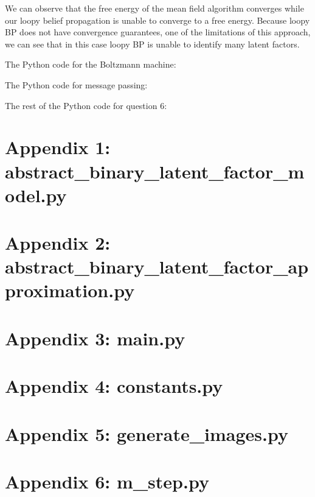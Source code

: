 \documentclass[12pt]{article}
\begin{document}
We can observe that the free energy of the mean field algorithm converges while our loopy belief propagation is unable to converge to a free energy. Because loopy BP does not have convergence guarantees, one of the limitations of this approach, we can see that in this case loopy BP is unable to identify many latent factors.

\newpage
The Python code for the Boltzmann machine:


\newpage
The Python code for message passing:


\newpage
The rest of the Python code for question 6:


\newpage
\section*{Appendix 1: abstract\_binary\_latent\_factor\_model.py}

\newpage
\section*{Appendix 2: abstract\_binary\_latent\_factor\_approximation.py}

\newpage
\section*{Appendix 3: main.py}

\newpage
\section*{Appendix 4: constants.py}

\newpage
\section*{Appendix 5: generate\_images.py}

\newpage
\section*{Appendix 6: m\_step.py}

\end{document}
